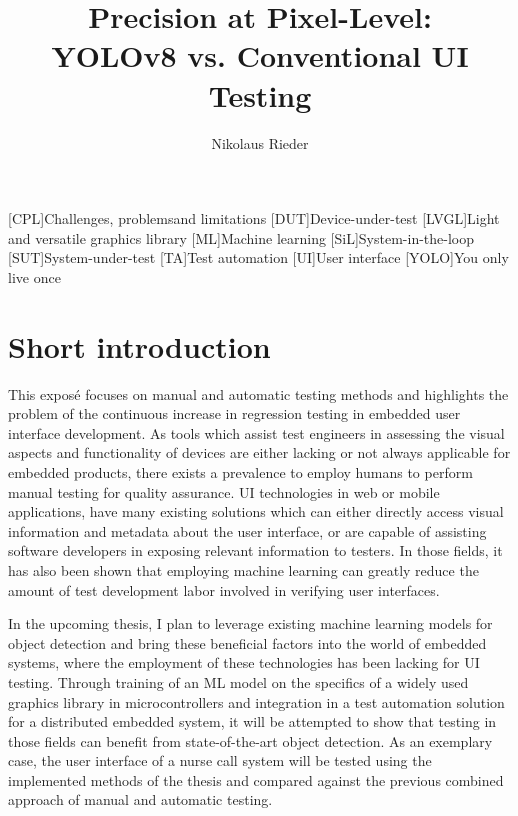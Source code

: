 \documentclass[Proposal,BIC,english,IEEE]{BASE/twbook} %
\title{Precision at Pixel-Level:\\YOLOv8 vs. Conventional UI Testing}
\author{Nikolaus Rieder}
\begin{document}
\maketitle

{}
\chapter*{\listacroname}
\begin{acronym}[XXXXX]
    [CPL]{Challenges, problemsand limitations}
    [DUT]{Device-under-test}
    [LVGL]{Light and versatile graphics library}
    [ML]{Machine learning}
    [SiL]{System-in-the-loop}
    [SUT]{System-under-test}
    [TA]{Test automation}
    [UI]{User interface}
    [YOLO]{You only live once}
\end{acronym}
\newpage
\chapter{Short introduction}
This exposé focuses on manual and automatic testing methods and highlights the problem of the continuous increase in regression testing in embedded user interface development. As tools which assist test engineers in assessing the visual aspects and functionality of devices are either lacking or not always applicable for embedded products, there exists a prevalence to employ humans to perform manual testing for quality assurance. UI technologies in web or mobile applications, have many existing solutions which can either directly access visual information and metadata about the user interface, or are capable of assisting software developers in exposing relevant information to testers. In those fields, it has also been shown that employing machine learning can greatly reduce the amount of test development labor involved in verifying user interfaces.

In the upcoming thesis, I plan to leverage existing machine learning models for object detection and bring these beneficial factors into the world of embedded systems, where the employment of these technologies has been lacking for UI testing. Through training of an ML model on the specifics of a widely used graphics library in microcontrollers and integration in a test automation solution for a distributed embedded system, it will be attempted to show that testing in those fields can benefit from state-of-the-art object detection. As an exemplary case, the user interface of a nurse call system will be tested using the implemented methods of the thesis and compared against the previous combined approach of manual and automatic testing.
\end{document}
